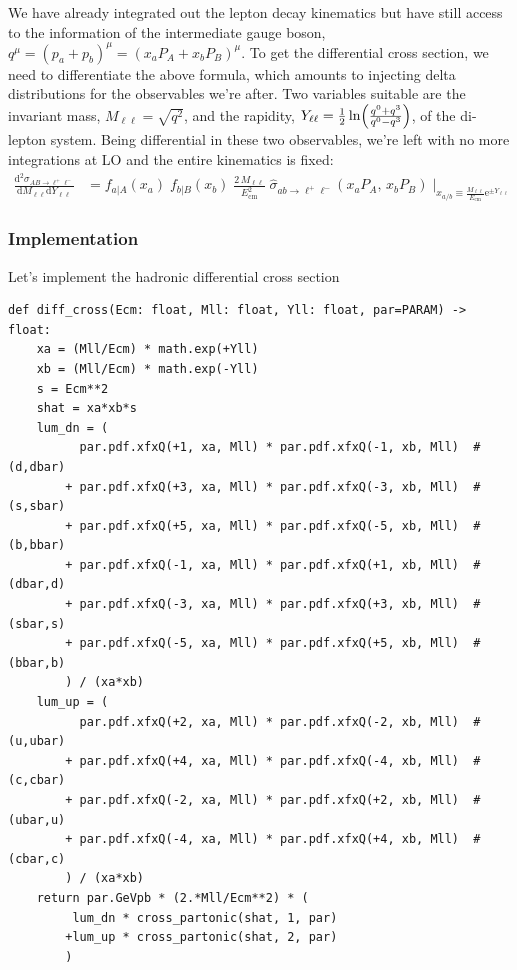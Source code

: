 \documentclass[11pt]{article}
\begin{document}
We have already integrated out the lepton decay kinematics but have still access to the information of the intermediate gauge boson, \(q^\mu = (p_a+p_b)^\mu = (x_a P_A + x_b P_B)^\mu\).
To get the differential cross section, we need to differentiate the above formula, which amounts to injecting delta distributions for the observables we're after.
Two variables suitable are the invariant mass, \(M_{\ell\ell} = \sqrt{q^2}\), and the rapidity, \(Y_{\ell\ell} = \tfrac{1}{2}\ln\Bigl(\tfrac{q^0+q^3}{q^0-q^3}\Bigr)\), of the di-lepton system.
Being differential in these two observables, we're left with no more integrations at LO and the entire kinematics is fixed:
\begin{align}
  \frac{\mathrm{d}^2\sigma_{A B \to \ell^+\ell^-}}{\mathrm{d}M_{\ell\ell}\mathrm{d}Y_{\ell\ell}}
  &=
  f_{a\vert A}(x_a) \; f_{b\vert B}(x_b) \; \frac{2\,M_{\ell\ell}}{E_\mathrm{cm}^2} \;
  \hat{\sigma}_{ab\to\ell^+\ell^-}(x_a P_A,\,x_b P_B)
  \;\bigg\vert_{x_{a/b}\equiv\tfrac{M_{\ell\ell}}{E_\mathrm{cm}}\mathrm{e}^{\pm Y_{\ell\ell}}}
\end{align}
\subsubsection{Implementation}
\label{sec:org7e225a6}
Let's implement the hadronic differential cross section
\begin{verbatim}
def diff_cross(Ecm: float, Mll: float, Yll: float, par=PARAM) -> float:
    xa = (Mll/Ecm) * math.exp(+Yll)
    xb = (Mll/Ecm) * math.exp(-Yll)
    s = Ecm**2
    shat = xa*xb*s
    lum_dn = (
          par.pdf.xfxQ(+1, xa, Mll) * par.pdf.xfxQ(-1, xb, Mll)  # (d,dbar)
        + par.pdf.xfxQ(+3, xa, Mll) * par.pdf.xfxQ(-3, xb, Mll)  # (s,sbar)
        + par.pdf.xfxQ(+5, xa, Mll) * par.pdf.xfxQ(-5, xb, Mll)  # (b,bbar)
        + par.pdf.xfxQ(-1, xa, Mll) * par.pdf.xfxQ(+1, xb, Mll)  # (dbar,d)
        + par.pdf.xfxQ(-3, xa, Mll) * par.pdf.xfxQ(+3, xb, Mll)  # (sbar,s)
        + par.pdf.xfxQ(-5, xa, Mll) * par.pdf.xfxQ(+5, xb, Mll)  # (bbar,b)
        ) / (xa*xb)
    lum_up = (
          par.pdf.xfxQ(+2, xa, Mll) * par.pdf.xfxQ(-2, xb, Mll)  # (u,ubar)
        + par.pdf.xfxQ(+4, xa, Mll) * par.pdf.xfxQ(-4, xb, Mll)  # (c,cbar)
        + par.pdf.xfxQ(-2, xa, Mll) * par.pdf.xfxQ(+2, xb, Mll)  # (ubar,u)
        + par.pdf.xfxQ(-4, xa, Mll) * par.pdf.xfxQ(+4, xb, Mll)  # (cbar,c)
        ) / (xa*xb)
    return par.GeVpb * (2.*Mll/Ecm**2) * (
         lum_dn * cross_partonic(shat, 1, par)
        +lum_up * cross_partonic(shat, 2, par)
        )
\end{verbatim}
\end{document}
